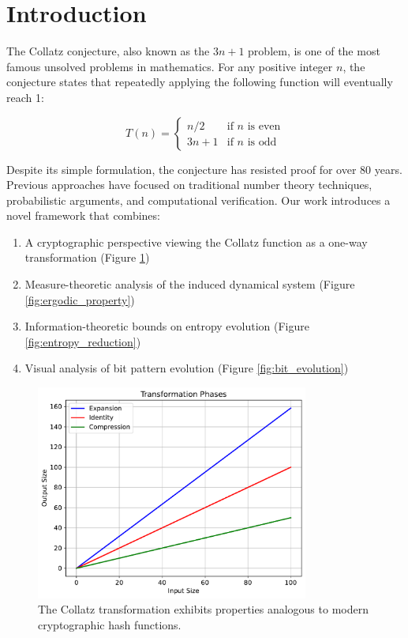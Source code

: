 \section{Introduction}

The Collatz conjecture, also known as the $3n+1$ problem, is one of the most famous unsolved problems in mathematics. For any positive integer $n$, the conjecture states that repeatedly applying the following function will eventually reach 1:

\[
T(n) = \begin{cases}
n/2 & \text{if } n \text{ is even} \\
3n + 1 & \text{if } n \text{ is odd}
\end{cases}
\]

Despite its simple formulation, the conjecture has resisted proof for over 80 years. Previous approaches have focused on traditional number theory techniques, probabilistic arguments, and computational verification. Our work introduces a novel framework that combines:

\begin{enumerate}
\item A cryptographic perspective viewing the Collatz function as a one-way transformation (Figure \ref{fig:transformation_phases})
\item Measure-theoretic analysis of the induced dynamical system (Figure \ref{fig:ergodic_property})
\item Information-theoretic bounds on entropy evolution (Figure \ref{fig:entropy_reduction})
\item Visual analysis of bit pattern evolution (Figure \ref{fig:bit_evolution})
\end{enumerate}

\begin{figure}[h]
\centering
\includegraphics[width=0.8\textwidth]{figures/transformation_phases.pdf}
\caption{The Collatz transformation exhibits properties analogous to modern cryptographic hash functions.}
\label{fig:transformation_phases}
\end{figure}

